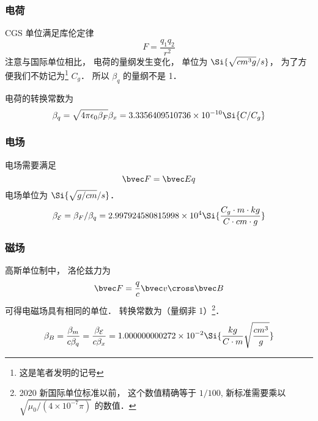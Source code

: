 
\begin{issues}
\issueDraft
\end{issues}


\subsubsection{电荷}
CGS 单位满足库伦定律
\begin{equation}
F = \frac{q_1 q_2}{r^2}
\end{equation}
注意与国际单位相比， 电荷的量纲发生变化， 单位为 $\Si{\sqrt{cm^3 g}/s}$， 为了方便我们不妨记为\footnote{这是笔者发明的记号} $C_g$． 所以 $\beta_q$ 的量纲不是 1．

电荷的转换常数为
\begin{equation}
\beta_q = \sqrt{4\pi\epsilon_0\beta_F} \beta_x = 3.3356409510736\times 10^{-10} \Si{C/C_g}
\end{equation}

\subsubsection{电场}
电场需要满足
\begin{equation}
\bvec F = \bvec E q
\end{equation}
电场单位为 $\Si{\sqrt{g/cm}/s}$．
\begin{equation}
\beta_{\mathcal E} = \beta_F/\beta_q = 2.997924580815998\times 10^4 \Si{\frac{C_g\cdot m\cdot kg}{C\cdot cm\cdot g}}
\end{equation}

\subsubsection{磁场}
高斯单位制中， 洛伦兹力为
\begin{equation}
\bvec F = \frac{q}{c} \bvec v \cross \bvec B
\end{equation}
可得电磁场具有相同的单位． 转换常数为（量纲非 1）\footnote{2020 新国际单位标准以前， 这个数值精确等于 $1/100$, 新标准需要乘以 $\sqrt{\mu_0/(4\times 10^{-7}\pi)}$ 的数值．}．
\begin{equation}
\beta_B = \frac{\beta_m}{c\beta_q} = \frac{\beta_{\mathcal E}}{c\beta_x} = 1.000000000272\times 10^{-2} \Si{\frac{kg}{C\cdot m}\sqrt{\frac{cm^3}{g}}}
\end{equation}
